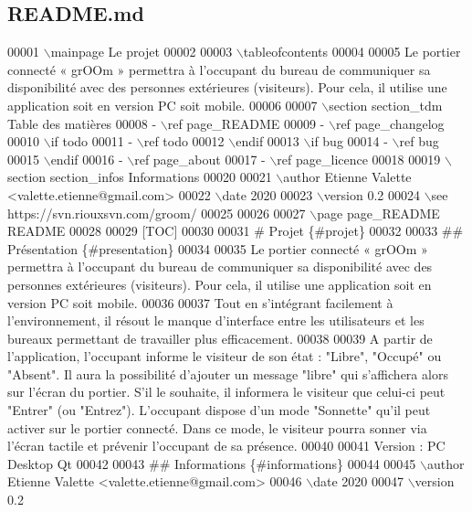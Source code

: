 \hypertarget{_r_e_a_d_m_e_8md_source}{}\subsection{R\+E\+A\+D\+M\+E.\+md}

\begin{DoxyCode}
00001 \(\backslash\)mainpage Le projet 
00002 
00003 \(\backslash\)tableofcontents
00004 
00005 Le portier connecté «​ grOOm​ » permettra à l'occupant du bureau de communiquer sa disponibilité avec
       des personnes extérieures (visiteurs). Pour cela, il utilise une application soit en version PC soit mobile.
00006 
00007 \(\backslash\)section section\_tdm Table des matières
00008 - \(\backslash\)ref page\_README
00009 - \(\backslash\)ref page\_changelog
00010 \(\backslash\)if todo
00011 - \(\backslash\)ref todo
00012 \(\backslash\)endif
00013 \(\backslash\)if bug
00014 - \(\backslash\)ref bug
00015 \(\backslash\)endif
00016 - \(\backslash\)ref page\_about
00017 - \(\backslash\)ref page\_licence
00018 
00019 \(\backslash\)section section\_infos Informations
00020 
00021 \(\backslash\)author Etienne Valette <valette.etienne@gmail.com>
00022 \(\backslash\)date 2020
00023 \(\backslash\)version 0.2
00024 \(\backslash\)see https://svn.riouxsvn.com/groom/
00025 
00026 
00027 \(\backslash\)page page\_README README
00028 
00029 [TOC]
00030 
00031 # Projet \{#projet\}
00032 
00033 ## Présentation \{#presentation\}
00034 
00035 Le portier connecté «​ grOOm​ » permettra à l'occupant du bureau de communiquer sa disponibilité avec
       des personnes extérieures (visiteurs). Pour cela, il utilise une application soit en version PC soit mobile.
00036 
00037 Tout en s'intégrant facilement à l'environnement, il résout le manque d'interface entre les
       utilisateurs et les bureaux permettant de travailler plus efficacement.
00038 
00039 A partir de l'application, l'occupant informe le visiteur de son état : "Libre", "Occupé" ou "Absent".
       Il aura la possibilité d'ajouter un message "libre" qui s'affichera alors sur l'écran du portier. S'il le
       souhaite, il informera le visiteur que celui-ci peut "Entrer" (ou "Entrez"). L'occupant dispose d'un mode
       "Sonnette" qu'il peut activer sur le portier connecté. Dans ce mode, le visiteur pourra sonner via l'écran
       tactile et prévenir l'occupant de sa présence.
00040 
00041 Version : PC Desktop Qt
00042 
00043 ## Informations \{#informations\}
00044 
00045 \(\backslash\)author Etienne Valette <valette.etienne@gmail.com>
00046 \(\backslash\)date 2020
00047 \(\backslash\)version 0.2

\end{DoxyCode}
